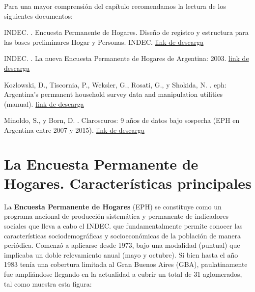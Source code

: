 \documentclass[
]{book}
\begin{document}
Para una mayor comprensión del capítulo recomendamos la lectura de los siguientes documentos:

INDEC. \citeyearpar{INDEC2020}. Encuesta Permanente de Hogares. Diseño de registro y estructura para las bases preliminares Hogar y Personas. INDEC. \href{https://www.indec.gob.ar/ftp/cuadros/menusuperior/eph/EPH_registro_1t20.pdf}{link de descarga}

INDEC. \citeyearpar{INDEC2003}. La nueva Encuesta Permanente de Hogares de Argentina: 2003. \href{https://www.indec.gob.ar/ftp/cuadros/sociedad/metodologia_eph_continua.pdf}{link de descarga}

Kozlowski, D., Tiscornia, P., Weksler, G., Rosati, G., y Shokida, N. \citeyearpar{kozlowski2020}. eph: Argentina's permanent household survey data and manipulation utilities (manual). \href{https://cloud.r-project.org/web/packages/eph/eph.pdf}{link de descarga}

Minoldo, S., y Born, D. \citeyearpar{Minoldo.Born2019}. Claroscuros: 9 años de datos bajo sospecha (EPH en Argentina entre 2007 y 2015). \href{https://issuu.com/cieseditora/docs/claroscuros_minoldo-born}{link de descarga}

\hypertarget{eph1}{%
\section{La Encuesta Permanente de Hogares. Características principales}\label{eph1}}

La \textbf{Encuesta Permanente de Hogares} (EPH) se constituye como un programa nacional de producción sistemática y permanente de indicadores sociales que lleva a cabo el INDEC. que fundamentalmente permite conocer las características sociodemográficas y socioeconómicas de la población de manera periódica. Comenzó a aplicarse desde 1973, bajo una modalidad (puntual) que implicaba un doble relevamiento anual (mayo y octubre). Si bien hasta el año 1983 tenía una cobertura limitada al Gran Buenos Aires (GBA), paulatinamente fue ampliándose llegando en la actualidad a cubrir un total de 31 aglomerados, tal como muestra esta figura:
\end{document}

